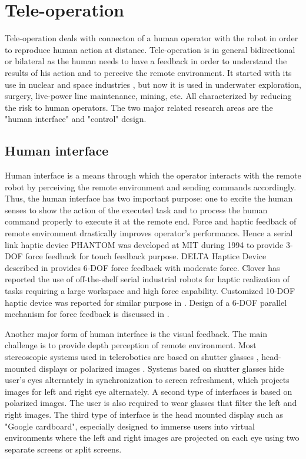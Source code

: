    
\section{Tele-operation}
Tele-operation deals with  connecton of a   human operator with the robot in order to reproduce human action at distance. Tele-operation is in general bidirectional or bilateral as the human needs to have a feedback in order to understand the results of his action and to perceive the remote environment. It started with its use in nuclear and space industries \cite{martin1985teleoperated,vertut1986teleoperations}, but now it is used in underwater exploration, surgery, live-power line maintenance, mining, etc. All characterized by reducing the risk to human operators. The two major related research areas are the "human interface" and "control" design.
\subsection{Human interface}

Human interface is a means through which the operator interacts with the remote robot by perceiving the remote environment and sending commands accordingly. Thus, the human interface has two important purpose: one to excite the human senses to show the action of the executed task and to process the human command properly to execute it at the remote end.  Force and haptic feedback of remote environment drastically improves operator's performance. Hence a serial link haptic device PHANTOM \cite{massie1994phantom} was developed at MIT during 1994 to provide 3-DOF force feedback  for touch feedback purpose. DELTA Haptice Device described in \cite{grange2001overview} provides 6-DOF force feedback with moderate force. Clover \cite{clover1997dynamic} has reported  the use of off-the-shelf serial industrial robots for haptic realization of tasks requiring a large workspace and high force capability. Customized 10-DOF  haptic device was reported  for similar purpose in \cite{ueberle2004vishard10}. Design  of a 6-DOF parallel mechanism for force feedback is discussed in \cite{yoon2001design}.

Another major form of human interface is the visual feedback. The main challenge is to provide depth perception of remote environment. Most stereoscopic systems used in telerobotics are based on shutter glasses \cite{aracil1997telerobotic,matthies1992stereo}, head-mounted displays \cite{matthies1992stereo} or polarized images \cite{hirzinger1994robots}. Systems based on shutter glasses hide user's eyes alternately in synchronization to screen refreshment, which projects images for left and right eye alternately. A second type of interfaces is based on polarized images. The user is also required to wear glasses that filter the left and right images. The third type of interface is  the head mounted display such as "Google cardboard",  especially designed to immerse users into virtual environments where the left and right images are projected on each eye using two separate screens or split screens.

